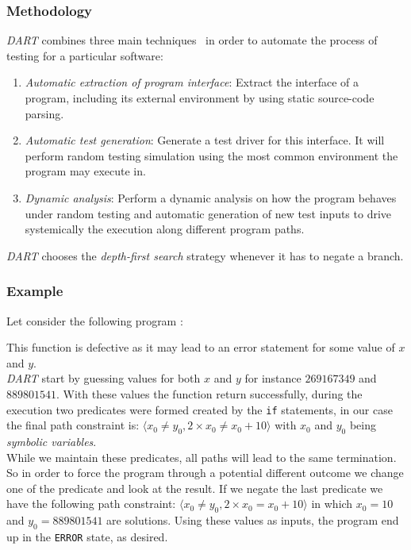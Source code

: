 \documentclass[11pt]{IEEEtran}
\begin{document}
    	\subsubsection{Methodology}
	    	\emph{DART} combines three main techniques~\cite{godefroid2005dart} in order to automate the process of testing for a particular software:
	    	\begin{enumerate}
	    		\item \emph{Automatic extraction of program interface}: Extract the interface of a program, including its external environment by using static source-code parsing.
	    		\item \emph{Automatic test generation}: Generate a test driver for this interface. It will perform random testing simulation using the most common environment the program may execute in.
	    		\item \emph{Dynamic analysis}: Perform a dynamic analysis on how the program behaves under random testing and automatic generation of new test inputs to drive systemically the execution along different program paths.
	    	\end{enumerate}

			\emph{DART} chooses the \emph{depth-first search} strategy whenever it has to negate a branch.

	    \subsubsection{Example}
		    Let consider the following program :

		    \begin{algorithm}


		    \end{algorithm}

	    	This function is defective as it may lead to an error statement for some value of $x$ and $y$.\\
	    	\emph{DART} start by guessing values for both $x$ and $y$ for instance $269167349$ and $889801541$. With these values the function return  successfully, during the execution two predicates were formed created by the \texttt{if} statements, in our case the final path constraint is: $\langle x_0 \neq y_0, 2 \times x_0 \neq x_0 + 10 \rangle$ with $x_0$ and $y_0$ being \emph{symbolic variables}.\\
	    	While we maintain these predicates, all paths will lead to the same termination. So in order to force the program through a potential different outcome we change one of the predicate and look at the result. If we negate the last predicate we have the following path constraint: $\langle x_0 \neq y_0, 2 \times x_0 = x_0 + 10 \rangle$ in which $x_0=10$ and $y_0=889801541$ are solutions. Using these values as inputs, the program end up in the \texttt{ERROR} state, as desired.
\end{document}
